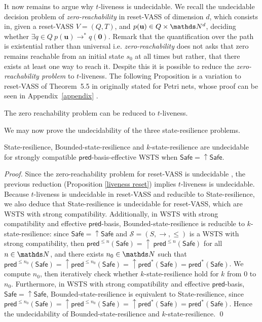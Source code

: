 \documentclass[runningheads]{llncs}
\newcommand{\pred}{\textsf{pred}}
\newcommand{\Safe}{\textsf{Safe}}
\begin{document}
It now remains to argue why {\sc $t$-liveness} is undecidable.
We  recall the
 undecidable \cite{araki1976PN} decision problem of {\em zero-reachability} in reset-VASS of dimension $d$, which consists in, given a
reset-VASS $V=(Q,T)$, and $p(\textbf{u}) \in Q \times \N^d$,
deciding whether $\exists q \in Q ~ p(\textbf{u}) \to^* q(\textbf{0})$.
%
Remark that the quantification over the path is existential rather than universal i.e. 
{\em zero-reachability}
does not asks that zero remains reachable from an initial state $s_0$ at all times but rather, that there exists at least one way to reach it.
Despite this it is possible to reduce 
the {\em zero-reachability problem} 
to
{\sc $t$-liveness}.
The following Proposition is a variation  to reset-VASS of Theorem~5.5 in \cite{peterson1981petri} originally stated for Petri nets, whose proof can be seen in Appendix~\ref{appendix}%
.
\begin{proposition}\label{liveness reset}
The  zero reachability problem can be reduced to {\sc $t$-liveness}.
\end{proposition}


We may now prove the undecidability of the three state-resilience problems.


\begin{proposition}\label{srp up down}
{\sc State-resilience},
{\sc Bounded-state-resilience} and
{\sc $k$-state-resilience}
are undecidable for strongly compatible $\pred$-basis-effective WSTS
when
$\Safe=\mathop{\uparrow} \Safe$.
\end{proposition}


\begin{proof}
Since the zero-reachability problem for reset-VASS is undecidable \cite{dufourd1998reset}, the previous reduction (Proposition \ref{liveness reset}) implies 
{\sc $t$-liveness} is undecidable.
Because
{\sc $t$-liveness} is undecidable in reset-VASS
and reducible to {\sc State-resilience}, we also deduce that {\sc State-resilience} is undecidable for reset-VASS, which are WSTS with strong compatibility.
Additionally, in WSTS with strong compatibility and effective $\pred$-basis, {\sc Bounded-state-resilience} is
reducible to {\sc $k$-state-resilience}:
since $\Safe=\mathop{\uparrow} \Safe$ and
$\mathscr{S}=(S,\rightarrow,\leq)$ is a WSTS with strong 
compatibility, then $\pred^{\leq n}(\Safe)= \mathop{\uparrow}~\pred^{\leq n}(\Safe)$ for all $n \in \N$,
and there exists $n_0 \in \N$ such that 
$\pred^{\leq n_0}(\Safe) = \mathop{\uparrow} \pred^{\leq n_0}(\Safe) = \mathop{\uparrow} \pred^*(\Safe) = \pred^*(\Safe)$.
We compute 
$n_0$, then iteratively check whether $k$-state-resilience 
hold for $k$ from $0$ to $n_0$.  
Furthermore, in WSTS with strong compatibility and effective $\pred$-basis,  $\Safe=\mathop{\uparrow} \Safe$, {\sc Bounded-state-resilience} is equivalent to {\sc State-resilience},
since 
$\pred^{\leq n_0}(\Safe) = \mathop{\uparrow} \pred^{\leq n_0}(\Safe) = {\mathop{\uparrow} \pred^*(\Safe)} = \pred^*(\Safe)$.
Hence the undecidability of {\sc Bounded-state-resilience}
and 
 {\sc $k$-state-resilience}. \qed
\end{proof}
\end{document}
